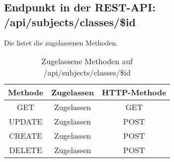 \subsection{Endpunkt in der REST-API: /api/subjects/classes/\$id}
Die  listet die zugelassenen Methoden. 

\begin{table}[!htbp]
	\begin{tabular}{|c|c|c|}
		\hline
			\textbf{Methode} & \textbf{Zugelassen} & \textbf{HTTP-Methode} \\ \hline
			GET & Zugelassen & GET \\ \hline
			UPDATE & Zugelassen & POST \\ \hline 
			CREATE & Zugelassen & POST \\ \hline 
			DELETE & Zugelassen & POST \\ \hline
	\end{tabular}

		\caption{Zugelassene Methoden auf /api/subjects/classes/\$id}
		\label{tab:end:rest:api:subjects:classes:id:meth}
\end{table}